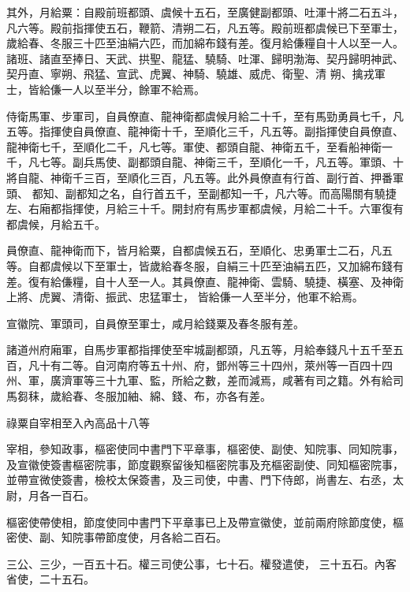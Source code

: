 \begin{pinyinscope}
 其外，月給粟：自殿前班都頭、虞候十五石，至廣健副都頭、吐渾十將二石五斗，凡六等。殿前指揮使五石，鞭箭、清朔二石，凡五等。殿前班都虞候已下至軍士，歲給春、冬服三十匹至油絹六匹，而加綿布錢有差。復月給傔糧自十人以至一人。諸班、諸直至捧日、天武、拱聖、龍猛、驍騎、吐渾、歸明渤海、契丹歸明神武、契丹直、寧朔、飛猛、宣武、虎翼、神騎、驍雄、威虎、衛聖、清
 朔、擒戎軍士，皆給傔一人以至半分，餘軍不給焉。



 侍衛馬軍、步軍司，自員僚直、龍神衛都虞候月給二十千，至有馬勁勇員七千，凡五等。指揮使自員僚直、龍神衛十千，至順化三千，凡五等。副指揮使自員僚直、龍神衛七千，至順化二千，凡七等。軍使、都頭自龍、神衛五千，至看船神衛一千，凡七等。副兵馬使、副都頭自龍、神衛三千，至順化一千，凡五等。軍頭、十將自龍、神衛千三百，至順化三百，凡五等。此外員僚直有行首、副行首、押番軍頭、
 都知、副都知之名，自行首五千，至副都知一千，凡六等。而高陽關有驍捷左、右廂都指揮使，月給三十千。開封府有馬步軍都虞候，月給二十千。六軍復有都虞候，月給五千。



 員僚直、龍神衛而下，皆月給粟，自都虞候五石，至順化、忠勇軍士二石，凡五等。自都虞候以下至軍士，皆歲給春冬服，自絹三十匹至油絹五匹，又加綿布錢有差。復有給傔糧，自十人至一人。其員僚直、龍神衛、雲騎、驍捷、橫塞、及神衛上將、虎翼、清衛、振武、忠猛軍士，
 皆給傔一人至半分，他軍不給焉。



 宣徽院、軍頭司，自員僚至軍士，咸月給錢粟及春冬服有差。



 諸道州府廂軍，自馬步軍都指揮使至牢城副都頭，凡五等，月給奉錢凡十五千至五百，凡十有二等。自河南府等五十州、府，鄧州等三十四州，萊州等一百四十四州、軍，廣濟軍等三十九軍、監，所給之數，差而減焉，咸著有司之籍。外有給司馬芻秣，歲給春、冬服加紬、綿、錢、布，亦各有差。



 祿粟自宰相至入內高品十八等



 宰相，參知政事，樞密使同中書門下平章事，樞密使、副使、知院事、同知院事，及宣徽使簽書樞密院事，節度觀察留後知樞密院事及充樞密副使、同知樞密院事，並帶宣微使簽書，檢校太保簽書，及三司使，中書、門下侍郎，尚書左、右丞，太尉，月各一百石。



 樞密使帶使相，節度使同中書門下平章事已上及帶宣徽使，並前兩府除節度使，樞密使、副、知院事帶節度使，月各給二百石。



 三公、三少，一百五十石。權三司使公事，七十石。權發遣使，
 三十五石。內客省使，二十五石。




\end{pinyinscope}
